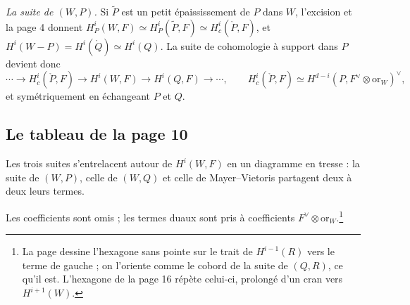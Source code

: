\documentclass[11pt,a4paper]{article}
\begin{document}
\emph{La suite de $(W, P)$.} Si $\widetilde{P}$ est un petit épaississement de
$P$ dans $W$, l'excision et la page 4 donnent
$H^{i}_{P}(W, F) \simeq H^{i}_{P}(\widetilde{P}, F) \simeq
H^{i}_{c}(\mathring{P}, F)$, et $H^{i}(W - P) = H^{i}(\mathring{Q}) \simeq
H^{i}(Q)$. La suite de cohomologie à support dans $P$ devient donc
\[
  \cdots \to H^{i}_{c}(\mathring{P}, F) \to H^{i}(W, F) \to H^{i}(Q, F) \to \cdots,
  \qquad H^{i}_{c}(\mathring{P}, F) \simeq H^{d-i}(P, F^{\vee} \otimes \mathrm{or}_{W})^{\vee},
\]
et symétriquement en échangeant $P$ et $Q$.

\subsection*{Le tableau de la page 10}

Les trois suites s'entrelacent autour de $H^{i}(W, F)$ en un diagramme en
tresse : la suite de $(W, P)$, celle de $(W, Q)$ et celle de Mayer--Vietoris
partagent deux à deux leurs termes.


Les coefficients sont omis ; les termes duaux sont pris à
coefficients $F^{\vee} \otimes \mathrm{or}_{W}$.\footnote{La page dessine
l'hexagone sans pointe sur le trait de $H^{i-1}(R)$ vers le terme de gauche ;
on l'oriente comme le cobord de la suite de $(Q, R)$, ce qu'il est.
L'hexagone de la page 16 répète celui-ci, prolongé d'un cran vers
$H^{i+1}(W)$.}
\end{document}
